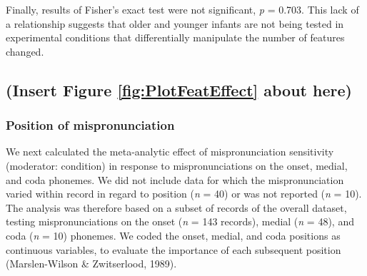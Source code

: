 \documentclass[man]{apa6}
\begin{document}
Finally, results of Fisher's exact test were not significant, \emph{p} = 0.703. This lack of a relationship suggests that older and younger infants are not being tested in experimental conditions that differentially manipulate the number of features changed.

\hypertarget{insert-figure-reffigplotfeateffect-about-here}{%
\subsection{(Insert Figure \ref{fig:PlotFeatEffect} about here)}\label{insert-figure-reffigplotfeateffect-about-here}}

\hypertarget{position-of-mispronunciation}{%
\subsubsection{Position of mispronunciation}\label{position-of-mispronunciation}}

We next calculated the meta-analytic effect of mispronunciation sensitivity (moderator: condition) in response to mispronunciations on the onset, medial, and coda phonemes. We did not include data for which the mispronunciation varied within record in regard to position (\emph{n} = 40) or was not reported (\emph{n} = 10). The analysis was therefore based on a subset of records of the overall dataset, testing mispronunciations on the onset (\emph{n} = 143 records), medial (\emph{n} = 48), and coda (\emph{n} = 10) phonemes. We coded the onset, medial, and coda positions as continuous variables, to evaluate the importance of each subsequent position (Marslen-Wilson \& Zwitserlood, 1989).
\end{document}
